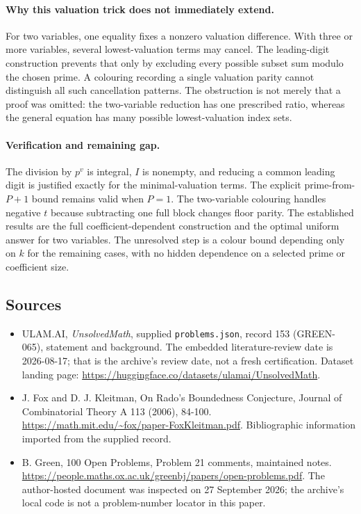 \documentclass[11pt,a4paper]{article}
\begin{document}
\paragraph{Why this valuation trick does not immediately extend.}
For two variables, one equality fixes a nonzero valuation difference. With three or more variables, several lowest-valuation terms may cancel. The leading-digit construction prevents that only by excluding every possible subset sum modulo the chosen prime. A colouring recording a single valuation parity cannot distinguish all such cancellation patterns. The obstruction is not merely that a proof was omitted: the two-variable reduction has one prescribed ratio, whereas the general equation has many possible lowest-valuation index sets.

\paragraph{Verification and remaining gap.}
The division by $p^v$ is integral, $I$ is nonempty, and reducing a common leading digit is justified exactly for the minimal-valuation terms. The explicit prime-from-$P+1$ bound remains valid when $P=1$. The two-variable colouring handles negative $t$ because subtracting one full block changes floor parity. The established results are the full coefficient-dependent construction and the optimal uniform answer for two variables. The unresolved step is a colour bound depending only on $k$ for the remaining cases, with no hidden dependence on a selected prime or coefficient size.

\subsection{Sources}

{\small

\begin{itemize}

\item[\hypertarget{source:153:1}{S1}] ULAM.AI, \emph{UnsolvedMath}, supplied \texttt{problems.json}, record 153 (GREEN-065), statement and background. The embedded literature-review date is 2026-08-17; that is the archive’s review date, not a fresh certification. Dataset landing page: \url{https://huggingface.co/datasets/ulamai/UnsolvedMath}.

\item[\hypertarget{source:153:2}{S2}] J. Fox and D. J. Kleitman, On Rado's Boundedness Conjecture, Journal of Combinatorial Theory A 113 (2006), 84-100. \url{https://math.mit.edu/~fox/paper-FoxKleitman.pdf}. Bibliographic information imported from the supplied record.

\item[\hypertarget{source:153:3}{S3}] B. Green, 100 Open Problems, Problem 21 comments, maintained notes. \url{https://people.maths.ox.ac.uk/greenbj/papers/open-problems.pdf}. The author-hosted document was inspected on 27 September 2026; the archive’s local code is not a problem-number locator in this paper.

\end{itemize}

}

\label{end:153}
\end{document}
